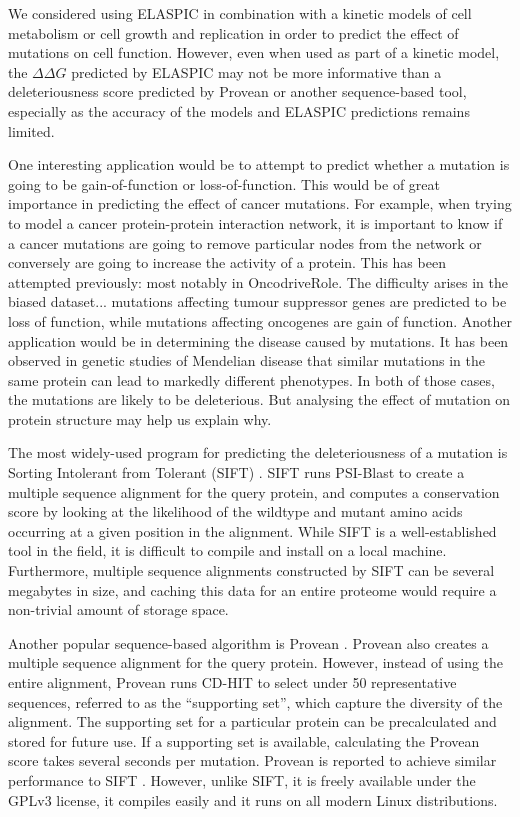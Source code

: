 We considered using ELASPIC in combination with a kinetic models of cell metabolism \cite{bordbar_personalized_2015} or cell growth and replication \cite{karr_whole-cell_2012} in order to predict the effect of mutations on cell function. However, even when used as part of a kinetic model, the $\Delta \Delta G$ predicted by ELASPIC may not be more informative than a deleteriousness score predicted by Provean or another sequence-based tool, especially as the accuracy of the models and ELASPIC predictions remains limited.

One interesting application would be to attempt to predict whether a mutation is going to be gain-of-function or loss-of-function. This would be of great importance in predicting the effect of cancer mutations. For example, when trying to model a cancer protein-protein interaction network, it is important to know if a cancer mutations are going to remove particular nodes from the network or conversely are going to increase the activity of a protein. This has been attempted previously: most notably in OncodriveRole. The difficulty arises in the biased dataset... mutations affecting tumour suppressor genes are predicted to be loss of function, while mutations affecting oncogenes are gain of function. Another application would be in determining the disease caused by mutations. It has been observed in genetic studies of Mendelian disease that similar mutations in the same protein can lead to markedly different phenotypes. In both of those cases, the mutations are likely to be deleterious. But analysing the effect of mutation on protein structure may help us explain why.

The most widely-used program for predicting the deleteriousness of a mutation is Sorting Intolerant from Tolerant (SIFT) \cite{ng_sift:_2003}. SIFT runs PSI-Blast to create a multiple sequence alignment for the query protein, and computes a conservation score by looking at the likelihood of the wildtype and mutant amino acids occurring at a given position in the alignment. While SIFT is a well-established tool in the field, it is difficult to compile and install on a local machine. Furthermore, multiple sequence alignments constructed by SIFT can be several megabytes in size, and caching this data for an entire proteome would require a non-trivial amount of storage space.

Another popular sequence-based algorithm is Provean \cite{choi_predicting_2012}. Provean also creates a multiple sequence alignment for the query protein. However, instead of using the entire alignment, Provean runs CD-HIT to select under 50 representative sequences, referred to as the ``supporting set'', which capture the diversity of the alignment. The supporting set for a particular protein can be precalculated and stored for future use. If a supporting set is available, calculating the Provean score takes several seconds per mutation. Provean is reported to achieve similar performance to SIFT \cite{choi_predicting_2012}. However, unlike SIFT, it is freely available under the GPLv3 license, it compiles easily and it runs on all modern Linux distributions.

